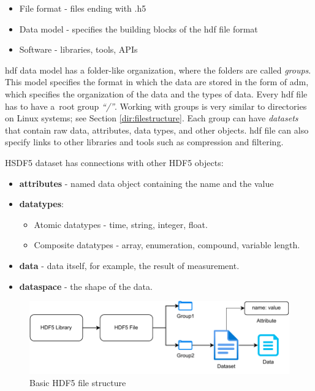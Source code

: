 \begin{itemize}
    \item File format - files ending with .h5
    \item Data model - specifies the building blocks of the \ac{hdf} file format
    \item Software - libraries, tools, APIs
\end{itemize}

\bigskip

\ac{hdf} data model has a folder-like organization, where the folders are called \textit{groups}. This model specifies the format in which the data are stored in the form of \ac{adm}, which specifies the organization of the data and the types of data. Every \ac{hdf} file has to have a~root group \textit{``/''}. Working with groups is very similar to directories on Linux systems; see Section \ref{dir:filestructure}. Each group can have \textit{datasets} that contain raw data, attributes, data types, and other objects. \ac{hdf} file can also specify links to other libraries and tools such as compression and filtering.

\bigskip
HSDF5 dataset has connections with other HDF5 objects:

\begin{itemize}
    \item \textbf{attributes} - named data object containing the name and the value
    \item \textbf{datatypes}:
    \begin{itemize}
        \item Atomic datatypes - time, string, integer, float.
        \item Composite datatypes - array, enumeration, compound, variable length.
    \end{itemize}
    \item \textbf{data} - data itself, for example, the result of measurement.
    \item \textbf{dataspace} - the shape of the data.
\end{itemize}


\begin{figure}
    \centering
    \includegraphics[width=\linewidth]{pdf/hdf5_file_structure.pdf}
    \caption{Basic HDF5 file structure}
    \label{fig:filestructure}
\end{figure}

